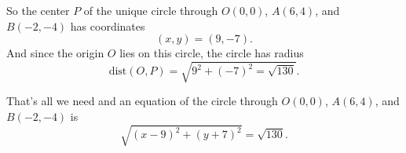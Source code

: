 \documentclass{ximera}
\begin{document}
\begin{question}
\begin{explanation}
So the center $P$ of the unique circle through $O(0,0)$, $A(6,4)$, and $B(-2,-4)$ has coordinates
\[
    (x,y) = (9, -7).
\]
And since the origin $O$ lies on this circle, the circle has radius 
\[
   \text{dist}(O,P) = \sqrt{9^2 + (-7)^2 = \sqrt{130}}.
\]
 
That's all we need and an equation of the circle through $O(0,0)$, $A(6,4)$, and $B(-2,-4)$ is
\[
  \sqrt{(x-9)^2 + (y+7)^2} = \sqrt{130} .
\]

\end{explanation}

\end{question}





\end{document}
